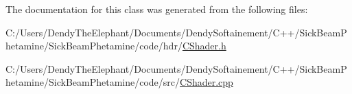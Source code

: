 The documentation for this class was generated from the following files\+:\begin{DoxyCompactItemize}
\item 
C\+:/\+Users/\+Dendy\+The\+Elephant/\+Documents/\+Dendy\+Softainement/\+C++/\+Sick\+Beam\+Phetamine/\+Sick\+Beam\+Phetamine/code/hdr/\hyperlink{_c_shader_8h}{C\+Shader.\+h}\item 
C\+:/\+Users/\+Dendy\+The\+Elephant/\+Documents/\+Dendy\+Softainement/\+C++/\+Sick\+Beam\+Phetamine/\+Sick\+Beam\+Phetamine/code/src/\hyperlink{_c_shader_8cpp}{C\+Shader.\+cpp}\end{DoxyCompactItemize}

